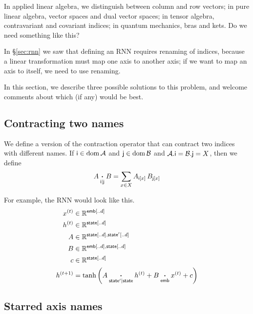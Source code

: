 \documentclass{article}
\newcommand{\nndot}[2]{\mathbin{\mathop{\boldsymbol\cdot}\limits_{\name{#1}|\name{#2}}}}
\DeclareMathOperator{\tupledom}{dom}
\newcommand{\tupleproj}[2]{#1.\name{#2}}
\begin{document}
In applied linear algebra, we distinguish between column and row vectors; in pure linear algebra, vector spaces and dual vector spaces; in tensor algebra, contravariant and covariant indices; in quantum mechanics, bras and kets. Do we need something like this?

In \S\ref{sec:rnn} we saw that defining an RNN requires renaming of indices, because a linear transformation must map one axis to another axis; if we want to map an axis to itself, we need to use renaming.

In this section, we describe three possible solutions to this problem, and welcome comments about which (if any) would be best.

\subsection{Contracting two names}

We define a version of the contraction operator that can contract two indices with different names. If $\name{i} \in \tupledom \mathcal{A}$ and $\name{j} \in \tupledom \mathcal{B}$ and $\tupleproj{\mathcal{A}}{i} = \tupleproj{\mathcal{B}}{j} = X$, then we define
\begin{equation*}
A \nndot{i}{j} B = \sum_{x \in X} A_{\nidx{i}{x}} \, B_{\nidx{j}{x}}
\end{equation*}

For example, the RNN would look like this.
\begin{align*}
x^{(t)} &\in \mathbb{R}^{\nset{emb}{..d}} \\
h^{(t)} &\in \mathbb{R}^{\nset{state}{..d}} \\
A &\in \mathbb{R}^{\nset{state}{..d}, \nset{state'}{..d}} \\
B &\in \mathbb{R}^{\nset{emb}{..d}, \nset{state}{..d}} \\
c &\in \mathbb{R}^{\nset{state}{..d}} \\
h^{(t+1)} &= \tanh\left( A \nndot{state'}{state} h^{(t)} + B \ndot{emb} x^{(t)} + c \right)
\end{align*}

\subsection{Starred axis names}
\end{document}
